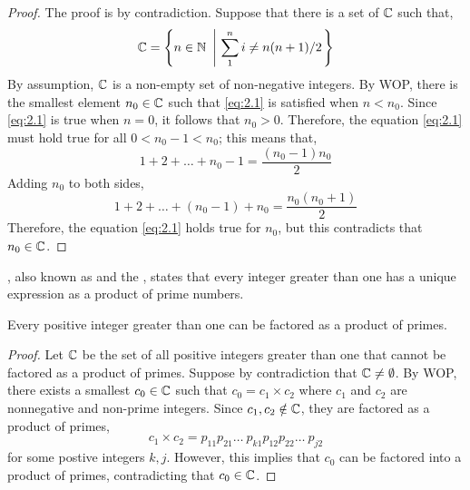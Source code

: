 \begin{proof}
    The proof is by contradiction. Suppose that there is a set of $\mathbb{C}$ such that,
    \begin{equation*}
        \ms{C} = \left\{ n \in \ms{N} \ \left| \ \sum_{1}^{n} i \neq n(n + 1)/2 \right. \right\}
    \end{equation*}
    By assumption, $\mathbb{C}$ is a non-empty set of non-negative integers. By WOP, there is the smallest
    element $n_0 \in \mathbb{C}$ such that \ref{eq:2.1} is satisfied when $n < n_0$. Since \ref{eq:2.1} is true
    when $n = 0$, it follows that $n_0 > 0$. Therefore, the equation \ref{eq:2.1} must hold true for all
    $0 < n_0 - 1 < n_0$; this means that,
    \begin{equation*}
        1 + 2 + \ldots + n_0 - 1 = \dfrac{(n_0 - 1)n_0}{2}
    \end{equation*}
    Adding $n_0$ to both sides,
    \begin{equation*}
        1 + 2 + \ldots + (n_0 - 1) + n_0 = \dfrac{n_0(n_0 + 1)}{2}
    \end{equation*}
    Therefore, the equation \ref{eq:2.1} holds true for $n_0$, but this contradicts
    that ${n_0 \in \mathbb{C}}$.
\end{proof}

, also known as 
and the , states that every integer greater
than one has a unique expression as a product of prime numbers.

\begin{claim}
    Every positive integer greater than one can be factored as a product
    of primes.
\end{claim}

\begin{proof}
    Let $\mathbb{C}$ be the set of all positive integers greater than one
    that cannot be factored as a product of primes. Suppose by contradiction
    that $\mathbb{C} \neq \emptyset$. By WOP, there exists a smallest $c_0 \in \mathbb{C}$ such that $c_0 = c_1 \times c_2$ where
    $c_1$ and $c_2$ are nonnegative and non-prime integers. Since $c_1, c_2 \notin \mathbb{C}$,
    they are factored as a product of primes,
    \begin{equation*}
        c_1 \times c_2 = p_{11}p_{21}\ldots\ p_{k1}p_{12}p_{22}\ldots\ p_{j2}
    \end{equation*}
    for some postive integers $k, j$. However, this implies that $c_0$ can be factored
    into a product of primes, contradicting that $c_0 \in \mathbb{C}$.
\end{proof}